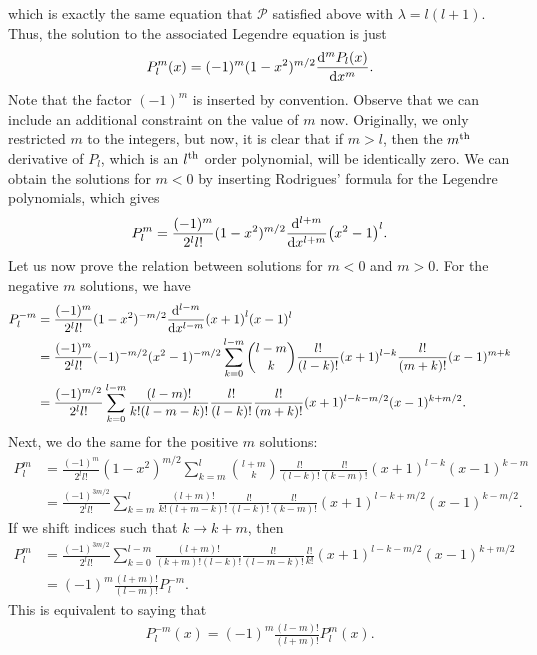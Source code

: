 which is exactly the same equation that $\mathcal{P}$ satisfied above with $\lambda = l(l+1)$.
Thus, the solution to the associated Legendre equation is just
\begin{eqnarray}
    P_{l}^{m}(x) = (-1)^{m}(1-x^2)^{m/2} \dv[m]{P_{l}(x)}{x}
.\end{eqnarray}
Note that the factor $(-1)^{m}$ is inserted by convention.
Observe that we can include an additional constraint on the value of $m$ now.
Originally, we only restricted $m$ to the integers, but now, it is clear that if $m > l$, then the $m^{\rm th}$ derivative of $P_{l}$, which is an $l^{\rm th}$ order polynomial, will be identically zero.
We can obtain the solutions for $m < 0$ by inserting Rodrigues' formula for the Legendre polynomials, which gives
\begin{eqnarray}
    P_{l}^{m} = \frac{(-1)^{m}}{2^{l} l!} (1-x^2)^{m/2} \dv[l+m]{x} (x^2-1)^{l}
.\end{eqnarray}
Let us now prove the relation between solutions for $m < 0$ and $m > 0$.
For the negative $m$ solutions, we have
\begin{align}
    P_{l}^{-m} &= \frac{(-1)^{m}}{2^{l} l!} (1-x^2)^{-m/2} \dv[l-m]{x} (x+1)^{l}(x-1)^{l} \nonumber \\
    &= \frac{(-1)^{m}}{2^{l} l!} (-1)^{-m/2} (x^2 - 1)^{-m/2} \sum_{k=0}^{l-m} \binom{l-m}{k} \frac{l!}{(l-k)!} (x+1)^{l-k} \frac{l!}{(m+k)!} (x - 1)^{m+k} \nonumber \\
    &= \frac{(-1)^{m/2}}{2^{l} l!} \sum_{k=0}^{l-m} \frac{(l-m)!}{k!(l-m-k)!} \frac{l!}{(l-k)!} \frac{l!}{(m+k)!} (x+1)^{l-k-m/2}(x-1)^{k+m/2}
.\end{align}
Next, we do the same for the positive $m$ solutions:
\begin{align}
    P_{l}^{m} &= \frac{(-1)^{m}}{2^{l} l!} (1-x^2)^{m/2} \sum_{k=m}^{l} \binom{l+m}{k} \frac{l!}{(l-k)!} \frac{l!}{(k-m)!} (x+1)^{l-k} (x-1)^{k-m} \nonumber \\
    &= \frac{(-1)^{3m/2}}{2^{l} l!} \sum_{k=m}^{l} \frac{(l+m)!}{k!(l+m-k)!} \frac{l!}{(l-k)!} \frac{l!}{(k-m)!} (x+1)^{l-k+m/2} (x-1)^{k-m/2}
.\end{align}
If we shift indices such that $k \rightarrow k + m$, then
\begin{align}
    P_{l}^{m} &= \frac{(-1)^{3m/2}}{2^{l} l!} \sum_{k=0}^{l-m} \frac{(l+m)!}{(k+m)!(l-k)!} \frac{l!}{(l - m - k)!} \frac{l!}{k!} (x+1)^{l-k-m/2} (x-1)^{k+m/2} \nonumber \\
    &= (-1)^{m} \frac{(l+m)!}{(l-m)!} P_{l}^{-m}
.\end{align}
This is equivalent to saying that
\begin{eqnarray}
    P_{l}^{-m}(x) = (-1)^{m} \frac{(l-m)!}{(l+m)!} P_{l}^{m}(x)
.\end{eqnarray}


